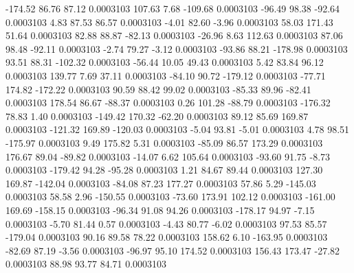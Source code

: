      -174.52       86.76       87.12     0.0003103
      107.63        7.68     -109.68     0.0003103
      -96.49       98.38      -92.64     0.0003103
        4.83       87.53       86.57     0.0003103
       -4.01       82.60       -3.96     0.0003103
       58.03      171.43       51.64     0.0003103
       82.88       88.87      -82.13     0.0003103
      -26.96        8.63      112.63     0.0003103
       87.06       98.48      -92.11     0.0003103
       -2.74       79.27       -3.12     0.0003103
      -93.86       88.21     -178.98     0.0003103
       93.51       88.31     -102.32     0.0003103
      -56.44       10.05       49.43     0.0003103
        5.42       83.84       96.12     0.0003103
      139.77        7.69       37.11     0.0003103
      -84.10       90.72     -179.12     0.0003103
      -77.71      174.82     -172.22     0.0003103
       90.59       88.42       99.02     0.0003103
      -85.33       89.96      -82.41     0.0003103
      178.54       86.67      -88.37     0.0003103
        0.26      101.28      -88.79     0.0003103
     -176.32       78.83        1.40     0.0003103
     -149.42      170.32      -62.20     0.0003103
       89.12       85.69      169.87     0.0003103
     -121.32      169.89     -120.03     0.0003103
       -5.04       93.81       -5.01     0.0003103
        4.78       98.51     -175.97     0.0003103
        9.49      175.82        5.31     0.0003103
      -85.09       86.57      173.29     0.0003103
      176.67       89.04      -89.82     0.0003103
      -14.07        6.62      105.64     0.0003103
      -93.60       91.75       -8.73     0.0003103
     -179.42       94.28      -95.28     0.0003103
        1.21       84.67       89.44     0.0003103
      127.30      169.87     -142.04     0.0003103
      -84.08       87.23      177.27     0.0003103
       57.86        5.29     -145.03     0.0003103
       58.58        2.96     -150.55     0.0003103
      -73.60      173.91      102.12     0.0003103
     -161.00      169.69     -158.15     0.0003103
      -96.34       91.08       94.26     0.0003103
     -178.17       94.97       -7.15     0.0003103
       -5.70       81.44        0.57     0.0003103
       -4.43       80.77       -6.02     0.0003103
       97.53       85.57     -179.04     0.0003103
       90.16       89.58       78.22     0.0003103
      158.62        6.10     -163.95     0.0003103
      -82.69       87.19       -3.56     0.0003103
      -96.97       95.10      174.52     0.0003103
      156.43      173.47      -27.82     0.0003103
       88.98       93.77       84.71     0.0003103
